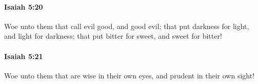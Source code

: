		\paragraph{Isaiah 5:20} %
			\label{ISAIAH-5-20}

			Woe unto them that call evil good, and good evil; that put darkness for light, and light for darkness; that put bitter for sweet, and sweet for bitter!


		\paragraph{Isaiah 5:21} %
			\label{ISAIAH-5-21}

			Woe unto them that are wise in their own eyes, and prudent in their own sight!


